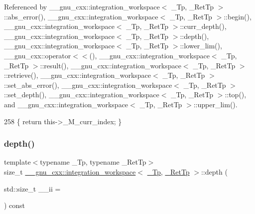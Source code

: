 Referenced by \+\_\+\+\_\+gnu\+\_\+cxx\+::integration\+\_\+workspace$<$ \+\_\+\+Tp, \+\_\+\+Ret\+Tp $>$\+::abs\+\_\+error(), \+\_\+\+\_\+gnu\+\_\+cxx\+::integration\+\_\+workspace$<$ \+\_\+\+Tp, \+\_\+\+Ret\+Tp $>$\+::begin(), \+\_\+\+\_\+gnu\+\_\+cxx\+::integration\+\_\+workspace$<$ \+\_\+\+Tp, \+\_\+\+Ret\+Tp $>$\+::curr\+\_\+depth(), \+\_\+\+\_\+gnu\+\_\+cxx\+::integration\+\_\+workspace$<$ \+\_\+\+Tp, \+\_\+\+Ret\+Tp $>$\+::depth(), \+\_\+\+\_\+gnu\+\_\+cxx\+::integration\+\_\+workspace$<$ \+\_\+\+Tp, \+\_\+\+Ret\+Tp $>$\+::lower\+\_\+lim(), \+\_\+\+\_\+gnu\+\_\+cxx\+::operator$<$$<$(), \+\_\+\+\_\+gnu\+\_\+cxx\+::integration\+\_\+workspace$<$ \+\_\+\+Tp, \+\_\+\+Ret\+Tp $>$\+::result(), \+\_\+\+\_\+gnu\+\_\+cxx\+::integration\+\_\+workspace$<$ \+\_\+\+Tp, \+\_\+\+Ret\+Tp $>$\+::retrieve(), \+\_\+\+\_\+gnu\+\_\+cxx\+::integration\+\_\+workspace$<$ \+\_\+\+Tp, \+\_\+\+Ret\+Tp $>$\+::set\+\_\+abs\+\_\+error(), \+\_\+\+\_\+gnu\+\_\+cxx\+::integration\+\_\+workspace$<$ \+\_\+\+Tp, \+\_\+\+Ret\+Tp $>$\+::set\+\_\+depth(), \+\_\+\+\_\+gnu\+\_\+cxx\+::integration\+\_\+workspace$<$ \+\_\+\+Tp, \+\_\+\+Ret\+Tp $>$\+::top(), and \+\_\+\+\_\+gnu\+\_\+cxx\+::integration\+\_\+workspace$<$ \+\_\+\+Tp, \+\_\+\+Ret\+Tp $>$\+::upper\+\_\+lim().


\begin{DoxyCode}
258       \{ \textcolor{keywordflow}{return} this->\_M\_curr\_index; \}
\end{DoxyCode}
\mbox{\label{class____gnu__cxx_1_1integration__workspace_ac5295379c8a8b07601cdc890fd0331a8}} 
\subsubsection{\texorpdfstring{depth()}{depth()}}
{\footnotesize\ttfamily template$<$typename \+\_\+\+Tp, typename \+\_\+\+Ret\+Tp$>$ \\
size\+\_\+t \hyperlink{class____gnu__cxx_1_1integration__workspace}{\+\_\+\+\_\+gnu\+\_\+cxx\+::integration\+\_\+workspace}$<$ \hyperlink{namespace____gnu__cxx_a3b19a9c800ca194374ef9172290f7d79}{\+\_\+\+Tp}, \hyperlink{namespace____gnu__cxx_a886e03ece3d53ff7fa6c098a40f93fa5}{\+\_\+\+Ret\+Tp} $>$\+::depth (\begin{DoxyParamCaption}\item[{std\+::size\+\_\+t}]{\+\_\+\+\_\+ii = {} }\end{DoxyParamCaption}) const\hspace{0.3cm}{\ttfamily [inline]}}

